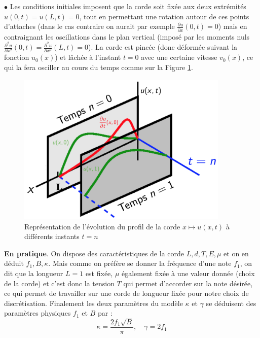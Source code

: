 \documentclass[a4,12pt]{article}
\begin{document}
$\bullet$ Les conditions initiales imposent que la corde soit fixée aux deux extrémités $u(0,t)=u(L,t)=0$, tout en permettant une rotation autour de ces points d'attaches (dans le cas contraire on aurait par exemple $\frac{\partial u}{\partial x}(0,t)=0$) mais en contraignant les oscillations dans le plan vertical (imposé par les moments nuls $\frac{\partial^2 u}{\partial x^2}(0,t)=\frac{\partial^2 u}{\partial x^2}(L,t)=0$). La corde est pincée (donc déformée suivant la fonction $u_0(x)$) et lâchée à l'instant $t=0$ avec une certaine vitesse $v_0(x)$, ce qui la fera osciller au cours du temps comme sur la Figure \ref{fig:profil}. \\

\begin{figure}
	\begin{center}
		\includegraphics[width=0.9\textwidth]{images/profils_corde.pdf}
		\caption{Représentation de l'évolution du profil de la corde $x\mapsto u(x,t)$ à différents instants $t=n$}
		\label{fig:profil}
	\end{center}
\end{figure}

\textbf{En pratique}. On dispose des caractéristiques de la corde $L,d,T,E,\mu$ et on en déduit $f_1,B,\kappa$. Mais comme on préfère se donner la fréquence d'une note $f_1$, on dit que la longueur $L=1$ est fixée, $\mu$ également fixée à une valeur donnée (choix de la corde) et c'est donc la tension $T$ qui permet d'accorder sur la note désirée, ce qui permet de travailler sur une corde de longueur fixée pour notre choix de discrétisation. Finalement les deux paramètres du modèle $\kappa$ et $\gamma$ se déduisent des paramètres physiques $f_1$ et $B$ par : 
\[
\kappa=\frac{2f_1 \sqrt{B}}{\pi}, \quad \gamma=2f_1
\]
\end{document}
